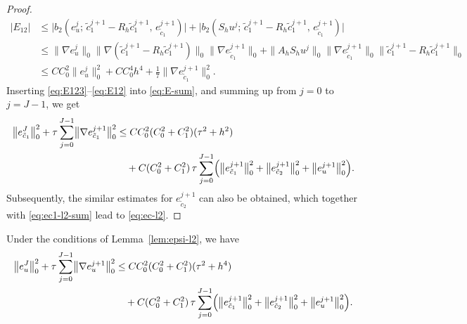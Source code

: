 \begin{proof}
\begin{align}
  |E_{12}|
  &\leq \bigl|b_{2}(e_{u}^{j};\, \tilde{c}_{1}^{j+1} - R_{h}\tilde{c}_{1}^{j+1},\,
                                   e_{\tilde{c}_{1}}^{j+1})\bigr|
       + \bigl|b_{2}(S_{h}u^{j};\, \tilde{c}_{1}^{j+1} - R_{h}\tilde{c}_{1}^{j+1},\,
                                    e_{\tilde{c}_{1}}^{j+1})\bigr|
  \nonumber\\
  &\leq \bigl\|\nabla e_{u}^{j}\bigr\|_{0}
         \bigl\|\nabla(\tilde{c}_{1}^{j+1} - R_{h}\tilde{c}_{1}^{j+1})\bigr\|_{0}
         \bigl\|\nabla e_{\tilde{c}_{1}}^{j+1}\bigr\|_{0}
       + \|A_{h}S_{h}u^{j}\|_{0}
         \bigl\|\nabla e_{\tilde{c}_{1}}^{j+1}\bigr\|_{0}
         \bigl\|\tilde{c}_{1}^{j+1} - R_{h}\tilde{c}_{1}^{j+1}\bigr\|_{0}
  \nonumber\\
  &\leq CC_{0}^{2}\bigl\|e_{u}^{j}\bigr\|_{0}^{2}
       + CC_{0}^{4}h^{4}
       + \frac{1}{7}\bigl\|\nabla e_{\tilde{c}_{1}}^{j+1}\bigr\|_{0}^{2}.
  \label{eq:E12}
\end{align}
Inserting \eqref{eq:E123}--\eqref{eq:E12} into \eqref{eq:E-sum}, and summing up from $j = 0$
to $j = J-1$, we get
\begin{align}
  \bigl\|e_{\tilde{c}_{1}}^{J}\bigr\|_{0}^{2}
  + \tau\sum_{j=0}^{J-1}\bigl\|\nabla e_{\tilde{c}_{1}}^{j+1}\bigr\|_{0}^{2}
  &\leq CC_{0}^{2}(C_{0}^{2}+C_{1}^{2})(\tau^{2}+h^{2})
  \nonumber\\
  &\quad + C(C_{0}^{2}+C_{1}^{2})\,\tau\sum_{j=0}^{J-1}
    \Bigl(\bigl\|e_{\tilde{c}_{1}}^{j+1}\bigr\|_{0}^{2}
         + \bigl\|e_{\tilde{c}_{2}}^{j+1}\bigr\|_{0}^{2}
         + \bigl\|e_{u}^{j+1}\bigr\|_{0}^{2}\Bigr).
  \label{eq:ec1-l2-sum}
\end{align}
Subsequently, the similar estimates for $e_{\tilde{c}_{2}}^{j+1}$ can also be obtained,
which together with \eqref{eq:ec1-l2-sum} lead to \eqref{eq:ec-l2}.
\end{proof}

\begin{lemma}\label{lem:eu-l2}
Under the conditions of Lemma~\ref{lem:epsi-l2}, we have
\begin{align}
  \bigl\|e_{u}^{J}\bigr\|_{0}^{2}
  + \tau\sum_{j=0}^{J-1}\bigl\|\nabla e_{u}^{j+1}\bigr\|_{0}^{2}
  &\leq CC_{0}^{2}(C_{0}^{2}+C_{1}^{2})(\tau^{2}+h^{4})
  \nonumber\\
  &\quad + C(C_{0}^{2}+C_{1}^{2})\,\tau\sum_{j=0}^{J-1}
    \Bigl(\bigl\|e_{\tilde{c}_{1}}^{j+1}\bigr\|_{0}^{2}
         + \bigl\|e_{\tilde{c}_{2}}^{j+1}\bigr\|_{0}^{2}
         + \bigl\|e_{u}^{j+1}\bigr\|_{0}^{2}\Bigr).
  \label{eq:eu-l2}
\end{align}
\end{lemma}

